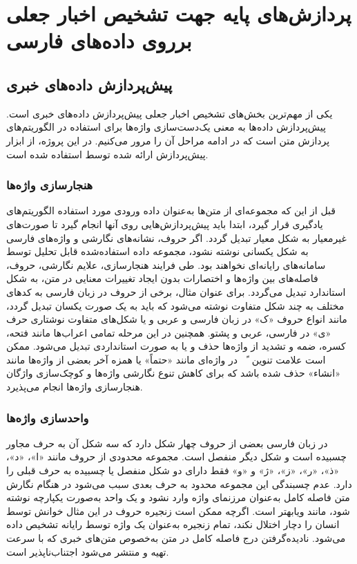 \chapter{پردازش‌های پایه جهت تشخیص اخبار جعلی برروی داده‌های فارسی}
\section{پیش‌پردازش داده‌های خبری}
یکی از مهم‌ترین بخش‌های تشخیص اخبار جعلی پیش‌پردازش داده‌های خبری است. پیش‌پردازش داده‌ها به معنی یک‌دست‌سازی واژه‌ها برای استفاده در الگوریتم‌های پردازش متن است که در ادامه مراحل آن را مرور می‌کنیم. در این پروژه، از ابزار پیش‌پردازش ارائه شده توسط \cite{Thesis_abdolah} استفاده شده است.
 

\subsection[هنجارسازی واژه‌ها]{هنجارسازی واژه‌ها}
قبل از این که مجموعه‌ای از متن‌ها به‌عنوان داده ورودی مورد استفاده الگوریتم‌های یادگیری قرار گیرد،  ابتدا باید پیش‌پردازش‌هایی روی آنها انجام گیرد تا صورت‌های غیرمعیار به شکل معیار تبدیل گردد. اگر حروف، نشانه‌های نگارشی و واژه‌های فارسی به شکل یکسانی نوشته نشود، مجموعه داده استفاده‌شده قابل تحلیل توسط سامانه‌های رایانه‌ای نخواهند بود. طی فرایند هنجارسازی، علایم نگارشی، حروف، فاصله‌های بین واژه‌ها و اختصارات  بدون ایجاد تغییرات معنایی در متن، به شکل استاندارد تبدیل می‌گردد. برای عنوان مثال، برخی از حروف در زبان فارسی به کدهای مختلف به چند شکل متفاوت نوشته می‌شود که باید به یک صورت یکسان تبدیل گردد، مانند انواع حروف «ک» در زبان فارسی و عربی و یا شکل‌های متفاوت نوشتاری حرف «ی» در فارسی، عربی و پشتو. همچنین در این مرحله تمامی اعراب‌ها مانند فتحه، کسره، ضمه  و تشدید از واژه‌ها حذف و یا به صورت استانداردی تبدیل می‌شود. ممکن است  علامت تنوین  ~ً~ در واژه‌ای مانند «حتماً» یا همزه آخر بعضی از واژه‌ها مانند «انشاء» حذف  شده باشد که برای کاهش تنوع نگارشی واژه‌ها و کوچک‌‌سازی واژگان هنجارسازی واژه‌ها انجام می‌پذیرد.


\subsection[واحدسازی واژه‌ها]{واحدسازی واژه‌ها}
در زبان فارسی بعضی از حروف چهار شکل دارد که سه شکل آن به حرف مجاور چسبیده است و شکل دیگر منفصل است. مجموعه محدودی از حروف مانند «ا»، «د»، «ذ»، «ر»، «ز»، «ژ» و «و» فقط دارای دو شکل منفصل یا چسبیده به حرف قبلی را دارد. عدم چسبندگی این مجموعه محدود به حرف بعدی سبب می‌شود در هنگام نگارش  متن فاصله کامل به‌عنوان مرزنمای واژه وارد نشود و یک واحد به‌صورت یکپارچه نوشته شود، مانند ویابهتر است. اگرچه ممکن است زنجیره حروف در این مثال خوانش توسط انسان را دچار اختلال نکند، تمام زنجیره به‌عنوان یک واژه توسط رایانه تشخیص داده می‌شود.  نادیده‌گرفتن درج فاصله کامل در متن به‌خصوص متن‌های خبری که با سرعت تهیه و منتشر می‌شود اجتناب‌ناپذیر است.

